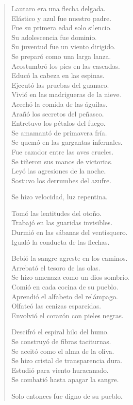\documentclass[12pt]{article}
\begin{document}
\clearpage
{}
\begin{verse}

Lautaro era una flecha delgada.\\
Elástico y azul fue nuestro padre.\\
Fue su primera edad solo silencio.\\
Su adolescencia fue dominio.\\
Su juventud fue un viento dirigido.\\
Se preparó como una larga lanza.\\
Acostumbró los pies en las cascadas.\\
Educó la cabeza en las espinas.\\
Ejecutó las pruebas del guanaco.\\
Vivió en las madrigueras de la nieve.\\
Acechó la comida de las águilas.\\
Arañó los secretos del peñasco.\\
Entretuvo los pétalos del fuego.\\
Se amamantó de primavera fría.\\
Se quemó en las gargantas infernales.\\
Fue cazador entre las aves crueles.\\
Se tiñeron sus manos de victorias.\\
Leyó las agresiones de la noche.\\
Sostuvo los derrumbes del azufre.  

Se hizo velocidad, luz repentina.  

Tomó las lentitudes del otoño.\\
Trabajó en las guaridas invisibles.\\
Durmió en las sábanas del ventisquero.\\
Igualó la conducta de las flechas.  

Bebió la sangre agreste en los caminos.\\
Arrebató el tesoro de las olas.\\
Se hizo amenaza como un dios sombrío.\\
Comió en cada cocina de su pueblo.\\
Aprendió el alfabeto del relámpago.\\
Olfateó las cenizas esparcidas.\\
Envolvió el corazón con pieles negras.  

Descifró el espiral hilo del humo.\\
Se construyó de fibras taciturnas.\\
Se aceitó como el alma de la oliva.\\
Se hizo cristal de transparencia dura.\\
Estudió para viento huracanado.\\
Se combatió hasta apagar la sangre.  

Solo entonces fue digno de su pueblo.  

\end{verse}
\end{document}

